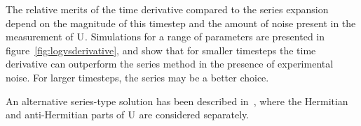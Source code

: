 The relative merits of the time derivative compared to the series expansion
depend on the magnitude of this timestep and the amount of noise present in the
measurement of \(\mathrm{U}\). Simulations for a range of parameters are presented
in figure~\ref{fig:logvsderivative}, and show that for smaller timesteps the
time derivative can outperform the series method in the presence of experimental
noise. For larger timesteps, the series may be a better choice.

An alternative series-type solution has been described in~\cite{hamiltomo},
where the Hermitian and anti-Hermitian parts of \(\mathrm{U}\) are considered
separately.





